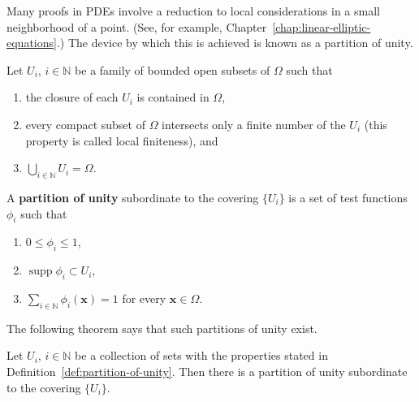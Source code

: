 Many proofs in PDEs involve a reduction to local considerations in a small neighborhood of a point. (See, for example, Chapter~\ref{chap:linear-elliptic-equations}.) The device by which this is achieved is known as a partition of unity.

\begin{Definition}
\label{def:partition-of-unity}
Let $U_i$, $i\in\mathbb{N}$ be a family of bounded open subsets of $\Omega$ such that
\begin{enumerate}
\item the closure of each $U_i$ is contained in $\Omega$,
\item every compact subset of $\Omega$ intersects only a finite number of the $U_i$ (this property is called local finiteness), and
\item $\bigcup_{i\in\mathbb{N}}U_i=\Omega$.
\end{enumerate}
A \textbf{partition of unity} subordinate to the covering $\{U_i\}$ is a set of test functions $\phi_i$ such that
\begin{enumerate}
\item $0\leq\phi_i\leq1$,
\item $\operatorname{supp}\phi_i\subset U_i$,
\item $\sum_{i\in\mathbb{N}}\phi_i(\bm{x})=1$ for every $\bm{x}\in\Omega$.
\end{enumerate}
\end{Definition}

The following theorem says that such partitions of unity exist.

\begin{Theorem}
\label{thm:partition-of-unity-existence}
Let $U_i$, $i\in\mathbb{N}$ be a collection of sets with the properties stated in Definition~\ref{def:partition-of-unity}. Then there is a partition of unity subordinate to the covering $\{U_i\}$.
\end{Theorem}

